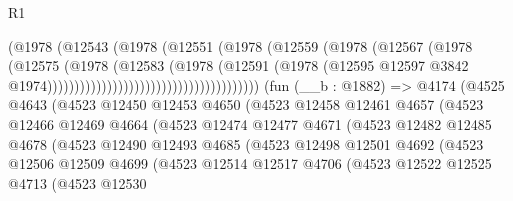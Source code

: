 \begin{lexlean}{R1}
\begin{coremodule}
                                                  (@1978
                                                    (@12543
                                                      (@1978
                                                        (@12551
                                                          (@1978
                                                            (@12559
                                                              (@1978
                                                                (@12567
                                                                  (@1978
                                                                    (@12575
                                                                      (@1978
                                                                        (@12583
                                                                          (@1978
                                                                            (@12591
                                                                              (@1978
                                                                                (@12595
                                                                                  @12597
                                                                                  @3842
                                                                                  @1974)))))))))))))))))))))))))))))))))))))))
    (fun (__b : @1882) =>
    @4174
      (@4525
        @4643
        (@4523
          @12450
          @12453
          @4650
          (@4523
            @12458
            @12461
            @4657
            (@4523
              @12466
              @12469
              @4664
              (@4523
                @12474
                @12477
                @4671
                (@4523
                  @12482
                  @12485
                  @4678
                  (@4523
                    @12490
                    @12493
                    @4685
                    (@4523
                      @12498
                      @12501
                      @4692
                      (@4523
                        @12506
                        @12509
                        @4699
                        (@4523
                          @12514
                          @12517
                          @4706
                          (@4523
                            @12522
                            @12525
                            @4713
                            (@4523
                              @12530

\end{coremodule}
\end{lexlean}
